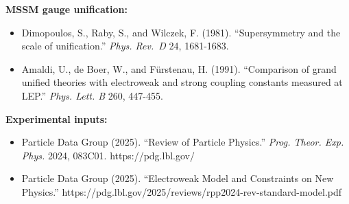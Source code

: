 \documentclass[
]{article}
\providecommand{\tightlist}{%
  \setlength{\itemsep}{0pt}\setlength{\parskip}{0pt}}
\begin{document}
\textbf{MSSM gauge unification:}

\begin{itemize}
\tightlist
\item
  Dimopoulos, S., Raby, S., and Wilczek, F. (1981). ``Supersymmetry and
  the scale of unification.'' \emph{Phys. Rev.~D} 24, 1681-1683.
\item
  Amaldi, U., de Boer, W., and Fürstenau, H. (1991). ``Comparison of
  grand unified theories with electroweak and strong coupling constants
  measured at LEP.'' \emph{Phys. Lett. B} 260, 447-455.
\end{itemize}

\textbf{Experimental inputs:}

\begin{itemize}
\tightlist
\item
  Particle Data Group (2025). ``Review of Particle Physics.''
  \emph{Prog. Theor. Exp. Phys.} 2024, 083C01. https://pdg.lbl.gov/
\item
  Particle Data Group (2025). ``Electroweak Model and Constraints on New
  Physics.''
  https://pdg.lbl.gov/2025/reviews/rpp2024-rev-standard-model.pdf
\end{itemize}
\end{document}
